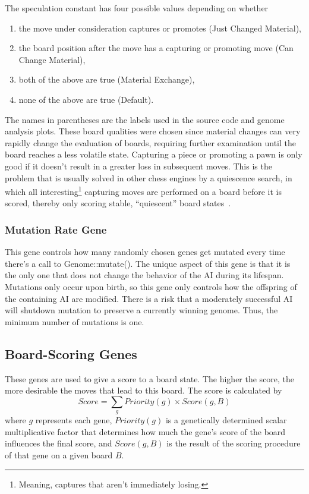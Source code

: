 \documentclass[letterpaper]{article}
\newcommand{\code}[1]{\small\textsf{#1}}
\renewcommand{\_}{\allowbreak\textunderscore\allowbreak}
\begin{document}
The speculation constant has four possible values depending on whether
\begin{enumerate}
	\item the move under consideration captures or promotes (Just Changed Material),
	\item the board position after the move has a capturing or promoting move (Can Change Material),
	\item both of the above are true (Material Exchange),
	\item none of the above are true (Default).
\end{enumerate}
The names in parentheses are the labels used in the source code and genome analysis plots. These board qualities were chosen since material changes can very rapidly change the evaluation of boards, requiring further examination until the board reaches a less volatile state. Capturing a piece or promoting a pawn is only good if it doesn't result in a greater loss in subsequent moves. This is the problem that is usually solved in other chess engines by a quiescence search, in which all interesting\footnote{Meaning, captures that aren't immediately losing.} capturing moves are performed on a board before it is scored, thereby only scoring stable, ``quiescent'' board states~\cite{quiescence-ref}.

\subsubsection{Mutation Rate Gene}
\label{mutation-rate-gene}
This gene controls how many randomly chosen genes get mutated every time there's a call to \code{Genome::mutate()}. The unique aspect of this gene is that it is the only one that does not change the behavior of the AI during its lifespan. Mutations only occur upon birth, so this gene only controls how the offspring of the containing AI are modified. There is a risk that a moderately successful AI will shutdown mutation to preserve a currently winning genome. Thus, the minimum number of mutations is one.

\subsection{Board-Scoring Genes}\label{board-score-section}
These genes are used to give a score to a board state. The higher the score, the more desirable the moves that lead to this board. The score is calculated by
\[Score = \sum_g Priority(g) \times Score(g,B)\]
where \(g\) represents each gene, \(Priority(g)\) is a genetically determined scalar multiplicative factor that determines how much the gene's score of the board influences the final score, and \(Score(g,B)\) is the result of the scoring procedure of that gene on a given board \(B\).
\end{document}
